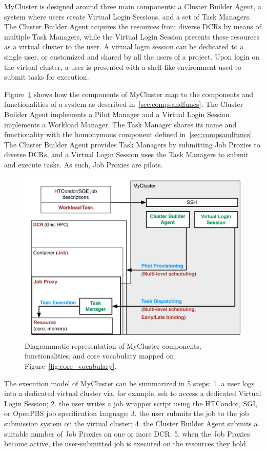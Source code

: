 \documentclass{sig-alternate}
\begin{document}
MyCluster is designed around three main components: a Cluster Builder Agent, a
system where users create Virtual Login Sessions, and a set of Task Managers.
The Cluster Builder Agent acquires the resources from diverse DCRs by means of
multiple Task Managers, while the Virtual Login Session presents these resources
as a virtual cluster to the user. A virtual login session can be dedicated to a
single user, or customized and shared by all the users of a project. Upon login
on the virtual cluster, a user is presented with a shell-like environment used
to submit tasks for execution.

Figure~\ref{fig:mycluster_comparison} shows how the components of MyCluster map
to the components and functionalities of a \pilot system as described
in~\ref{sec:compsandfuncs}: The Cluster Builder Agent implements a Pilot Manager
and a Virtual Login Session implements a Workload Manager. The Task Manager
shares its name and functionality with the homonymous component defined
in~\ref{sec:compsandfuncs}. The Cluster Builder Agent provides Task Managers by
submitting Job Proxies to diverse DCRs, and a Virtual Login Session uses the
Task Managers to submit and execute tasks. As such, Job Proxies are pilots.

\begin{figure}[t]
    \centering
        \includegraphics[width=.48\textwidth]{figures/mycluster_comparison.pdf}
    \caption{Diagrammatic representation of MyCluster components,
    functionalities, and core vocabulary mapped on
    Figure~\ref{fig:core_vocabulary}.}
    \label{fig:mycluster_comparison}
\end{figure}

The execution model of MyCluster can be summarized in 5 steps: 1. a user logs
into a dedicated virtual cluster via, for example, ssh to access a dedicated
Virtual Login Session; 2. the user writes a job wrapper script using the
HTCondor, SGI, or OpenPBS job specification language; 3. the user submits the
job to the job submission system on the virtual cluster; 4. the Cluster Builder
Agent submits a suitable number of Job Proxies on one or more DCR; 5. when the
Job Proxies become active, the user-submitted job is executed on the resources
they hold.
\end{document}
